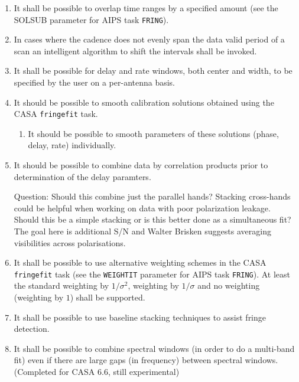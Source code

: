 \documentclass[11pt,a4paper]{article}
\begin{document}
\begin{enumerate}[subseclist]

\item It shall be possible to overlap time ranges by a specified
  amount (see the SOLSUB parameter for AIPS task \texttt{FRING}).

\item In cases where the cadence does not evenly span the data valid
  period of a scan an intelligent algorithm to shift the intervals
  shall be invoked.

\item It shall be possible for delay and rate windows, both center and
  width, to be specified by the user on a per-antenna basis.

\item It should be possible to smooth calibration solutions obtained
  using the CASA \texttt{fringefit} task.

\begin{enumerate}[subsecsublist]

\item It should be possible to smooth parameters of these solutions
  (phase, delay, rate) individually.

\end{enumerate}

\item It should be possible to combine data by correlation products
  prior to determination of the delay paramters.

  Question: Should this combine just the parallel hands?  Stacking
  cross-hands could be helpful when working on data with poor
  polarization leakage.  Should this be a simple stacking or is this
  better done as a simultaneous fit?  The goal here is additional S/N
  and Walter Brisken suggests averaging visibilities across
  polarisations.

\item It shall be possible to use alternative weighting schemes in
  the CASA \texttt{fringefit} task (see the \texttt{WEIGHTIT}
  parameter for AIPS task \texttt{FRING}).  At least the standard
  weighting by $1/\sigma^2$, weighting by $1/\sigma$ and no weighting
  (weighting by $1$) shall be supported.

\item It shall be possible to use baseline stacking techniques to
  assist fringe detection.

\item It shall be possible to combine spectral windows (in order to do
  a multi-band fit) even if there are large gaps (in frequency)
  between spectral windows.  (Completed for CASA 6.6, still experimental)


\end{enumerate}
\end{document}

